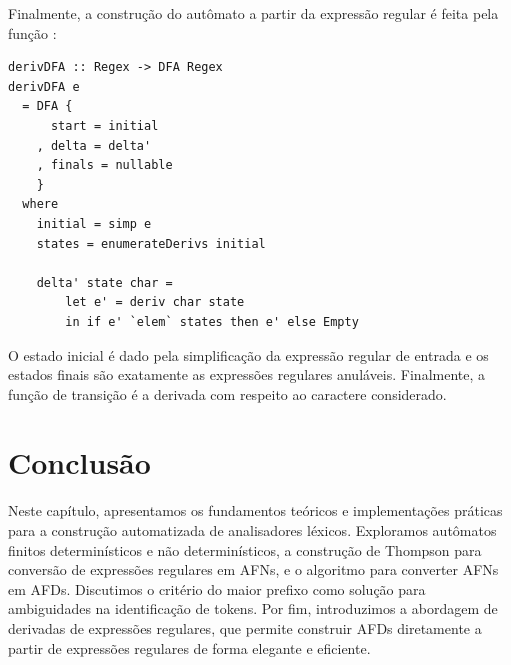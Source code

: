     Finalmente, a construção do autômato a partir da expressão
    regular é feita pela função :

\begin{verbatim}
derivDFA :: Regex -> DFA Regex
derivDFA e
  = DFA {
      start = initial
    , delta = delta'
    , finals = nullable
    }
  where
    initial = simp e
    states = enumerateDerivs initial

    delta' state char =
        let e' = deriv char state
        in if e' `elem` states then e' else Empty
\end{verbatim}

    O estado inicial é dado pela simplificação da expressão regular
    de entrada e os estados finais são exatamente as expressões
    regulares anuláveis. Finalmente, a função de transição é a
    derivada com respeito ao caractere considerado.

    \section{Conclusão}

    Neste capítulo, apresentamos os fundamentos teóricos e
    implementações práticas para a construção automatizada de
    analisadores léxicos. Exploramos autômatos finitos
    determinísticos e não determinísticos, a construção de Thompson
    para conversão de expressões regulares em AFNs, e o algoritmo
    para converter AFNs em AFDs. Discutimos o critério do maior
    prefixo como solução para ambiguidades na identificação de
    tokens. Por fim, introduzimos a abordagem de derivadas de
    expressões regulares, que permite construir AFDs diretamente a
    partir de expressões regulares de forma elegante e eficiente.
